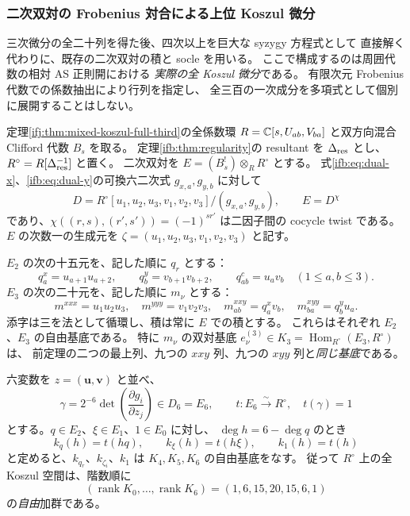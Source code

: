 \subsubsection{二次双対の Frobenius 対合による上位 Koszul 微分}
\label{ifj:subsubsec:mixed-koszul-frobenius}

三次微分の全二十列を得た後、四次以上を巨大な syzygy 方程式として
直接解く代わりに、既存の二次双対の積と socle を用いる。
ここで構成するのは周囲代数の相対 AS 正則開における
\emph{実際の全 Koszul 微分}である。
有限次元 Frobenius 代数での係数抽出により行列を指定し、
全三百の一次成分を多項式として個別に展開することはしない。

\begin{theorem}
\label{ifj:thm:mixed-koszul-frobenius-upper}
定理\ref{ifj:thm:mixed-koszul-full-third}の全係数環
$R=\mathbb C[s,U_{ab},V_{ba}]$ と双方向混合 Clifford 代数 $B_s$ を取る。
定理\ref{ifb:thm:regularity}の resultant を
$\Delta_{\rm res}$ とし、$R^\circ=R[\Delta_{\rm res}^{-1}]$ と置く。
二次双対を $E=(B_s^!)\otimes_RR^\circ$ とする。
式\eqref{ifb:eq:dual-x}、\eqref{ifb:eq:dual-y}の可換六二次式
$g_{x,a},g_{y,b}$ に対して
\[
 D=R^\circ[u_1,u_2,u_3,v_1,v_2,v_3]/(g_{x,a},g_{y,b}),
 \qquad E=D^\chi
\]
であり、$\chi((r,s),(r',s'))=(-1)^{sr'}$ は二因子間の
cocycle twist である。$E$ の次数一の生成元を
$\zeta=(u_1,u_2,u_3,v_1,v_2,v_3)$ と記す。

$E_2$ の次の十五元を、記した順に $q_r$ とする：
\begin{equation}\label{ifj:eq:mixed-frobenius-E2-basis}
 q_a^x=u_{a+1}u_{a+2},\qquad
 q_b^y=v_{b+1}v_{b+2},\qquad
 q_{ab}^c=u_av_b \quad(1\le a,b\le3).
\end{equation}
$E_3$ の次の二十元を、記した順に $m_\nu$ とする：
\begin{equation}\label{ifj:eq:mixed-frobenius-E3-basis}
 m^{xxx}=u_1u_2u_3,\quad m^{yyy}=v_1v_2v_3,\quad
 m^{xxy}_{ab}=q_a^xv_b,\quad
 m^{xyy}_{ba}=q_b^yu_a.
\end{equation}
添字は三を法として循環し、積は常に $E$ での積とする。
これらはそれぞれ $E_2$、$E_3$ の自由基底である。
特に $m_\nu$ の双対基底
$e_\nu^{(3)}\in K_3=\operatorname{Hom}_{R^\circ}(E_3,R^\circ)$ は、
前定理の二つの最上列、九つの $xxy$ 列、九つの $xyy$ 列と\emph{同じ基底}である。

六変数を $z=(\mathbf u,\mathbf v)$ と並べ、
\begin{equation}\label{ifj:eq:mixed-frobenius-socle}
 \gamma=2^{-6}\det\left(\frac{\partial g_i}{\partial z_j}\right)
             \in D_6=E_6,
 \qquad t:E_6\xrightarrow{\sim}R^\circ,\quad t(\gamma)=1
\end{equation}
とする。$q\in E_2$、$\xi\in E_1$、$1\in E_0$ に対し、
$\deg h=6-\deg q$ のとき
\[
 k_q(h)=t(hq),\qquad k_\xi(h)=t(h\xi),\qquad k_1(h)=t(h)
\]
と定めると、$k_{q_r}$、$k_{\zeta_i}$、$k_1$ は
$K_4,K_5,K_6$ の自由基底をなす。
従って $R^\circ$ 上の全 Koszul 空間は、階数順に
\begin{equation}\label{ifj:eq:mixed-frobenius-free-ranks}
 (\operatorname{rank}K_0,\ldots,\operatorname{rank}K_6)
              =(1,6,15,20,15,6,1)
\end{equation}
の\emph{自由}加群である。


\end{theorem}
